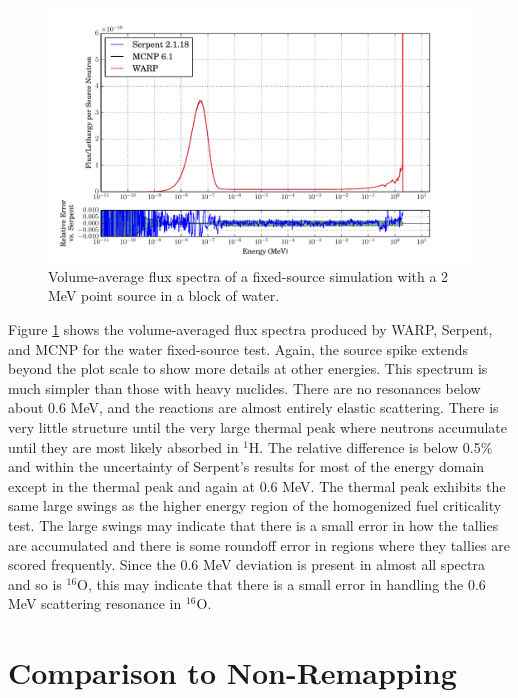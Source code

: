 \begin{figure}[h!]
\centering
\includegraphics[width=\textwidth,trim= 1cm 0cm 1cm 0cm]{graphics/finalresults/fixed_spec_water.pdf}
\caption{Volume-average flux spectra of a fixed-source simulation with a 2 MeV point source in a block of water. \label{fixed_spec_water} }
\end{figure}

Figure \ref{fixed_spec_water} shows the volume-averaged flux spectra produced by WARP, Serpent, and MCNP for the water fixed-source test.  Again, the source spike extends beyond the plot scale to show more details at other energies.  This spectrum is much simpler than those with heavy nuclides.  There are no resonances below about 0.6 MeV, and the reactions are almost entirely elastic scattering.  There is very little structure until the very large thermal peak where neutrons accumulate until they are most likely absorbed in $^1$H.  The relative difference is below 0.5\% and within the uncertainty of Serpent's results for most of the energy domain except in the thermal peak and again at 0.6 MeV.  The thermal peak exhibits the same large swings as the higher energy region of the homogenized fuel criticality test.  The large swings may indicate that there is a small error in how the tallies are accumulated and there is some roundoff error in regions where they tallies are scored frequently.   Since the 0.6 MeV deviation is present in almost all spectra and so is $^{16}$O, this may indicate that there is a small error in handling the 0.6 MeV scattering resonance in $^{16}$O.  


\section{Comparison to Non-Remapping}

